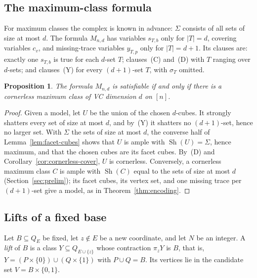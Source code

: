 \documentclass[11pt]{article}
\numberwithin{equation}{section}
\newtheorem{proposition}[theorem]{Proposition}
\theoremstyle{definition}
\theoremstyle{remark}
\newcommand{\Sh}{\operatorname{Sh}}
\begin{document}
\subsection{The maximum-class formula}
\label{sec:maximum-formula}

For maximum classes the complex is known in advance: \(\Sigma\) consists of
all sets of size at most \(d\).  The formula \(M_{n,d}\) has variables
\(s_{T,b}\) only for \(|T|=d\), covering variables \(c_v\), and missing-trace
variables \(y_{T,p}\) only for \(|T|=d+1\).  Its clauses are: exactly one
\(s_{T,b}\) is true for each \(d\)-set \(T\); clauses~(C) and~(D) with \(T\)
ranging over \(d\)-sets; and clauses~(Y) for every \((d+1)\)-set \(T\),
with \(\sigma_T\) omitted.

\begin{proposition}
\label{prop:maximum-encoding}
The formula \(M_{n,d}\) is satisfiable if and only if there is a
cornerless maximum class of VC dimension \(d\) on \([n]\).
\end{proposition}

\begin{proof}
Given a model, let \(U\) be the union of the chosen \(d\)-cubes.  It
strongly shatters every set of size at most \(d\), and by~(Y) it shatters
no \((d+1)\)-set, hence no larger set.  With \(\Sigma\) the sets of size at
most \(d\), the converse half of Lemma~\ref{lem:facet-cubes} shows that
\(U\) is ample with \(\Sh(U)=\Sigma\), hence maximum, and that the chosen
cubes are its facet cubes.  By~(D) and
Corollary~\ref{cor:cornerless-cover}, \(U\) is cornerless.  Conversely, a
cornerless maximum class \(C\) is ample with \(\Sh(C)\) equal to the sets
of size at most \(d\) (Section~\ref{sec:prelim}); its facet cubes, its
vertex set, and one missing trace per \((d+1)\)-set give a model, as in
Theorem~\ref{thm:encoding}.
\end{proof}

\subsection{Lifts of a fixed base}
\label{sec:lift-formula}

Let \(B\subseteq Q_E\) be fixed, let \(z\notin E\) be a new coordinate,
and let \(N\) be an integer.  A \emph{lift} of \(B\) is a class
\(Y\subseteq Q_{E\cup\{z\}}\) whose contraction \(\pi_zY\) is \(B\), that is,
\(Y=(P\times\{0\})\cup(Q\times\{1\})\) with \(P\cup Q=B\).  Its vertices lie
in the candidate set \(V=B\times\{0,1\}\).
\end{document}

